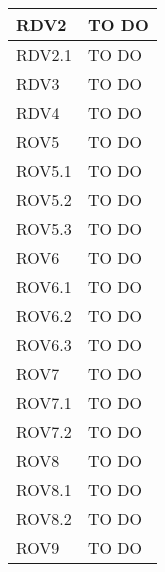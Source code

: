 \begin{center}
\begin{longtable}{| p{4cm} | p{8cm} |}
RDV2   &  TO DO \\
\hline
RDV2.1   &  TO DO \\
\hline
RDV3   &  TO DO \\
\hline
RDV4   &  TO DO \\
\hline
ROV5   &  TO DO \\
\hline
ROV5.1   &  TO DO \\
\hline
ROV5.2   &  TO DO \\
\hline
ROV5.3   &  TO DO \\
\hline
ROV6   &  TO DO \\
\hline
ROV6.1   &  TO DO \\
\hline
ROV6.2   &  TO DO \\
\hline
ROV6.3   &  TO DO \\
\hline
ROV7   &  TO DO \\
\hline
ROV7.1   &  TO DO \\
\hline
ROV7.2   &  TO DO \\
\hline
ROV8   &  TO DO \\
\hline
ROV8.1   &  TO DO \\
\hline
ROV8.2   &  TO DO \\
\hline
ROV9   &  TO DO \\
\hline
\end{longtable}
\egroup
\end{center}
